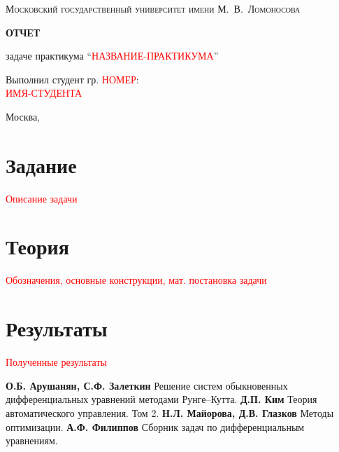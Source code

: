 \documentclass[a4paper,12pt]{article}
\newcommand{\UpdateMe}[1]{\textcolor{red}{#1}}
\newcommand{\University}{Московский государственный университет имени М.~В.~Ломоносова}
\newcommand{\Department}{Кафедра \UpdateMe{НАЗВАНИЕ-КАФЕДРЫ}}
\newcommand{\Student}{\UpdateMe{ИМЯ-СТУДЕНТА}}
\newcommand{\GroupNum}{\UpdateMe{НОМЕР}}
\newcommand{\Seminar}{\UpdateMe{НАЗВАНИЕ-ПРАКТИКУМА}}
\begin{document}
\begin{titlepage}
    \centering
    {\scshape\Large \University\par}\vspace{1cm}{\scshape\large \Department\par}
    \vfill
    {\huge\bfseries ОТЧЕТ\par}{ задаче практикума \enquote{\Seminar}\par}
    \vfill
    \hfill\begin{minipage}{0.45\linewidth}Выполнил студент гр. \GroupNum:\\\Student\end{minipage}
    \vfill
    {\large Москва, \the\year{}\par}
\end{titlepage}

\section*{Задание}
\UpdateMe{Описание задачи}

\section*{Теория}
\UpdateMe{Обозначения, основные конструкции, мат. постановка задачи}

\section*{Результаты}
\UpdateMe{Полученные результаты}

\begin{thebibliography}{99}
  \textbf{О.Б. Арушанян, С.Ф. Залеткин} Решение систем обыкновенных дифференциальных уравнений методами Рунге--Кутта.
  \textbf{Д.П. Ким} Теория автоматического управления. Том 2.
  \textbf{Н.Л. Майорова, Д.В. Глазков} Методы оптимизации.
  \textbf{А.Ф. Филиппов} Сборник задач по дифференциальным уравнениям.
\end{thebibliography}
\end{document}

